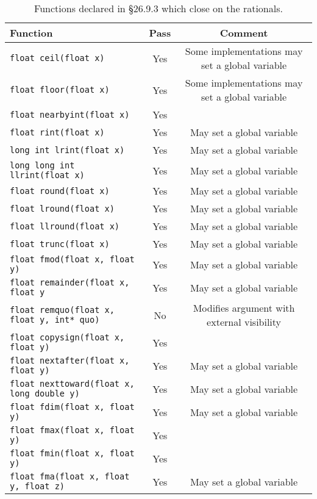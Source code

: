 \documentclass[prd,preprint,amsmath,amssymb,nofootinbib,eqsecnum]{revtex4-1}
\newcommand{\code}[1]{{\tt #1}}
\begin{document}
\begin{table}[h]
	\begin{tabular}{lcc}
		Function & Pass & Comment
	\\
	\hline \hline
		\code{float ceil(float x)} &  Yes & Some implementations may set a global variable
	\\
	\hline
		\code{float floor(float x)} & Yes & Some implementations may set a global variable
	\\
	\hline
		\code{float nearbyint(float x)} & Yes &
	\\
	\hline
		\code{float rint(float x)} & Yes & May set a global variable
	\\
	\hline
		\code{long int lrint(float x)} &  Yes & May set a global variable
	\\
	\hline
		\code{long long int llrint(float x)} & Yes & May set a global variable 
	\\
	\hline
		\code{float round(float x)} & Yes & May set a global variable
	\\
	\hline
		\code{float lround(float x)} & Yes & May set a global variable
	\\
	\hline
		\code{float llround(float x)} & Yes & May set a global variable
	\\
	\hline
		\code{float trunc(float x)} &  Yes & May set a global variable
	\\
	\hline
		\code{float fmod(float x, float y)} & Yes & May set a global variable
	\\
	\hline
		\code{float remainder(float x, float y} & Yes & May set a global variable
	\\
	\hline
		\code{float remquo(float x, float y, int* quo)} & No & Modifies argument with external visibility
	\\
	\hline
		\code{float copysign(float x, float y)} & Yes &
	\\
	\hline
		\code{float nextafter(float x, float y)} & Yes & May set a global variable
	\\
	\hline
		\code{float nexttoward(float x, long double y)} & Yes & May set a global variable
	\\
	\hline
		\code{float fdim(float x, float y)} & Yes & May set a global variable
	\\
	\hline
		\code{float fmax(float x, float y)} & Yes &
	\\
	\hline
		\code{float fmin(float x, float y)} & Yes &
	\\
	\hline
		\code{float fma(float x, float y, float z)} & Yes & May set a global variable
	\end{tabular}
\caption{Functions declared in \S 26.9.3 which close on the rationals.}
\label{tab:26.9.3}
\end{table}
\end{document}
